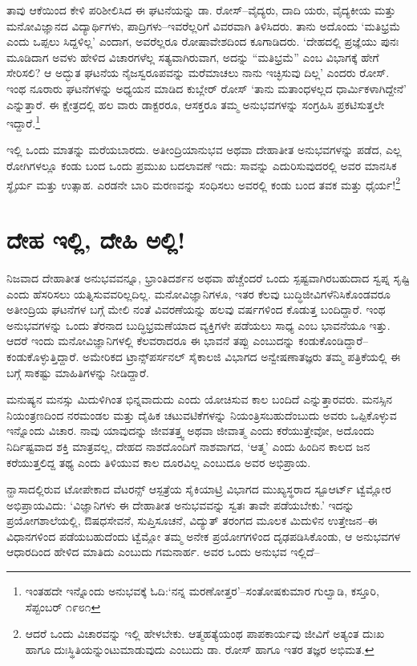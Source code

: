 ತಾವು ಆಕೆಯಿಂದ ಕೇಳಿ ಪರಿಶೀಲಿಸಿದ ಈ ಘಟನೆಯನ್ನು ಡಾ. ರೋಸ್​–ವೈದ್ಯರು, ದಾದಿ ಯರು, ವೈದ್ಯಕೀಯ ಮತ್ತು ಮನೋವಿಜ್ಞಾನದ ವಿದ್ಯಾರ್ಥಿಗಳು, ಪಾದ್ರಿಗಳು–ಇವರೆಲ್ಲರಿಗೆ ವಿವರವಾಗಿ ತಿಳಿಸಿದರು. ತಾನು ಅದೊಂದು ‘ಮತಿಭ್ರಮೆ ಎಂದು ಒಪ್ಪಲು ಸಿದ್ದಳಿಲ್ಲ’ ಎಂದಾಗ, ಅವರೆಲ್ಲರೂ ರೋಷಾವೇಶದಿಂದ ಕೂಗಾಡಿದರು. ‘ದೇಹದಲ್ಲಿ ಪ್ರಜ್ಞೆಯು ಪುನಃ ಮೂಡಿದಾಗ ಅವಳು ಹೇಳಿದ ವಿಚಾರಗಳೆಲ್ಲ ಸತ್ಯವಾಗಿರುವಾಗ, ಅದನ್ನು “ಮತಿಭ್ರಮೆ” ಎಂಬ ವಿಭಾಗಕ್ಕೆ ಹೇಗೆ ಸೇರಿಸಲಿ? ಆ ಅದ್ಭುತ ಘಟನೆಯ ನೈಜಸ್ವರೂಪವನ್ನು ಮರೆಮಾಚಲು ನಾನು ಇಚ್ಛಿಸುವು ದಿಲ್ಲ’ ಎಂದರು ರೋಸ್. ಇಂಥ ನೂರಾರು ಘಟನೆಗಳನ್ನು ಅಧ್ಯಯನ ಮಾಡಿದ ಕುಬ್ಲೇರ್ ರೋಸ್ ‘ತಾನು ಮತಾಂಧಳಲ್ಲದ ಧಾರ್ಮಿಕಳಾಗಿದ್ದೇನೆ’ ಎನ್ನುತ್ತಾರೆ. ಈ ಕ್ಷೇತ್ರದಲ್ಲಿ ಹಲ ವಾರು ಡಾಕ್ಟರರೂ, ಆಸಕ್ತರೂ ತಮ್ಮ ಅನುಭವಗಳನ್ನು ಸಂಗ್ರಹಿಸಿ ಪ್ರಕಟಿಸುತ್ತಲೇ ಇದ್ದಾರೆ.\footnote{ ಇಂತಹದೇ ಇನ್ನೊಂದು ಅನುಭವಕ್ಕೆ ಓದಿ:‘ನನ್ನ ಮರಣೋತ್ತರ’–ಸಂತೋಷಕುಮಾರ ಗುಲ್ವಾಡಿ, ಕಸ್ತೂರಿ, ಸೆಪ್ಟಂಬರ್ ೧೯೮೧}

ಇಲ್ಲಿ ಒಂದು ಮಾತನ್ನು ಮರೆಯಬಾರದು. ಅತೀಂದ್ರಿಯಾನುಭವ ಅಥವಾ ದೇಹಾತೀತ ಅನುಭವಗಳನ್ನು ಪಡೆದ, ಎಲ್ಲ ರೋಗಿಗಳಲ್ಲೂ ಕಂಡು ಬಂದ ಒಂದು ಪ್ರಮುಖ ಬದಲಾವಣೆ ಇದು: ಸಾವನ್ನು ಎದುರಿಸುವುದರಲ್ಲಿ ಅವರ ಮಾನಸಿಕ ಸ್ಥೈರ್ಯ ಮತ್ತು ಉತ್ಸಾಹ. ಎರಡನೇ ಬಾರಿ ಮರಣವನ್ನು ಸಂಧಿಸಲು ಅವರಲ್ಲಿ ಕಂಡು ಬಂದ ತವಕ ಮತ್ತು ಧೈರ್ಯ!\footnote{ ಆದರೆ ಒಂದು ವಿಚಾರವನ್ನು ಇಲ್ಲಿ ಹೇಳಬೇಕು. ಆತ್ಮಹತ್ಯೆಯಂಥ ಪಾಪಕಾರ್ಯವು ಜೀವಿಗೆ ಅತ್ಯಂತ ದುಃಖ ಹಾಗೂ ದುಃಸ್ಥಿತಿಯನ್ನುಂಟುಮಾಡುವುದು ಎಂಬುದು ಡಾ. ರೋಸ್ ಹಾಗೂ ಇತರ ತಜ್ಞರ ಅಭಿಮತ.}


\section{ದೇಹ ಇಲ್ಲಿ, ದೇಹಿ ಅಲ್ಲಿ!}

ನಿಜವಾದ ದೇಹಾತೀತ ಅನುಭವವನ್ನೂ, ಭ್ರಾಂತಿದರ್ಶನ ಅಥವಾ ಹೆಚ್ಚೆಂದರೆ ಒಂದು ಸ್ಪಷ್ಟವಾಗಿರಬಹುದಾದ ಸ್ವಪ್ನ ಸೃಷ್ಟಿ ಎಂದು ಹೆಸರಿಸಲು ಯತ್ನಿಸುವವರಿಲ್ಲದಿಲ್ಲ. ಮನೋವಿಜ್ಞಾನಿಗಳೂ, ಇತರ ಕೆಲವು ಬುದ್ಧಿಜೀವಿಗಳೆನಿಸಿಕೊಂಡವರೂ ಅತೀಂದ್ರಿಯ ಘಟನೆಗಳ ಬಗ್ಗೆ ಮೇಲಿ ನಂತೆ ವಿವರಣೆಯನ್ನು ಹಲವು ವರ್ಷಗಳಿಂದ ಕೊಡುತ್ತ ಬಂದಿದ್ದಾರೆ. ಇಂಥ ಅನುಭವಗಳನ್ನು ಒಂದು ತೆರನಾದ ಬುದ್ಧಿಭ್ರಮಣೆಯಾದ ವ್ಯಕ್ತಿಗಳೇ ಪಡೆಯಲು ಸಾಧ್ಯ ಎಂಬ ಭಾವನೆಯೂ ಇತ್ತು. ಆದರೆ ಇಂದು ಮನೋವಿಜ್ಞಾನಿಗಳಲ್ಲಿ ಕೆಲವರಾದರೂ ಈ ಭಾವನೆ ತಪ್ಪು ಎಂಬುದನ್ನು ಕಂಡುಕೊಂಡಿದ್ದಾರೆ–ಕಂಡುಕೊಳ್ಳುತ್ತಿದ್ದಾರೆ. ಅಮೇರಿಕದ ಟ್ರಾನ್ಸ್​ಪರ್ಸನಲ್ ಸೈಕಾಲಜಿ ವಿಭಾಗದ ಅನ್ವೇಷಣಾತಜ್ಞರು ತಮ್ಮ ಪತ್ರಿಕೆಯಲ್ಲಿ ಈ ಬಗ್ಗೆ ಸಾಕಷ್ಟು ಮಾಹಿತಿಗಳನ್ನು ನೀಡಿದ್ದಾರೆ.

ಮನುಷ್ಯನ ಮನಸ್ಸು ಮಿದುಳಿಗಿಂತ ಭಿನ್ನವಾದುದು ಎಂದು ಯೋಚಿಸುವ ಕಾಲ ಬಂದಿದೆ ಎನ್ನುತ್ತಾರವರು. ಮನಸ್ಸಿನ ನಿಯಂತ್ರಣದಿಂದ ನರಮಂಡಲ ಮತ್ತು ದೈಹಿಕ ಚಟುವಟಿಕೆಗಳನ್ನು ನಿಯಂತ್ರಿಸಬಹುದೆಂಬುದು ಅವರು ಒಪ್ಪಿಕೊಳ್ಳುವ ಇನ್ನೊಂದು ವಿಚಾರ. ನಾವು ಯಾವುದನ್ನು ಜೀವತತ್ತ್ವ ಅಥವಾ ಜೀವಾತ್ಮ ಎಂದು ಕರೆಯುತ್ತೇವೋ, ಅದೊಂದು ನಿರ್ದಿಷ್ಟವಾದ ಶಕ್ತಿ ಮಾತ್ರವಲ್ಲ, ದೇಹದ ನಾಶದೊಂದಿಗೆ ನಾಶವಾಗದ, ‘ಆತ್ಮ’ ಎಂದು ಹಿಂದಿನ ಕಾಲದ ಜನ ಕರೆಯುತ್ತಲಿದ್ದ ತಥ್ಯ ಎಂದು ತಿಳಿಯುವ ಕಾಲ ದೂರವಿಲ್ಲ ಎಂಬುದೂ ಅವರ ಅಭಿಪ್ರಾಯ.

ನ್ಹಾಸಾದಲ್ಲಿರುವ ಟೋಪೇಕಾದ ವೆಟರನ್ಸ್ ಆಸ್ಪತ್ರೆಯ ಸೈಕಿಯಾಟ್ರಿ ವಿಭಾಗದ ಮುಖ್ಯಸ್ಥರಾದ ಸ್ಟೂಆರ್ಟ್ ಟ್ವೆಮ್ಲೋರ ಅಭಿಪ್ರಾಯವಿದು: ‘ವಿಜ್ಞಾನಿಗಳು ಈ ದೇಹಾತೀತ ಅನುಭವವನ್ನು ಸ್ವತಃ ತಾವೇ ಪಡೆಯಬೇಕು.’ ಇದನ್ನು ಪ್ರಯೋಗಶಾಲೆಯಲ್ಲಿ, ಔಷಧಸೇವನೆ, ಸುಪ್ತಿಸೂಚನೆ, ವಿದ್ಯುತ್ ತರಂಗದ ಮೂಲಕ ಮಿದುಳಿನ ಉತ್ತೇಜನ–ಈ ವಿಧಾನಗಳಿಂದ ಪಡೆಯಬಹುದೆಂದು ಟ್ವೆಮ್ಲೋ ತಮ್ಮ ಅನೇಕ ಪ್ರಯೋಗಗಳಿಂದ ದೃಢಪಡಿಸಿಕೊಂಡು, ಆ ಅನುಭವಗಳ ಆಧಾರದಿಂದ ಹೇಳಿದ ಮಾತಿದು ಎಂಬುದು ಗಮನಾರ್ಹ. ಅವರ ಒಂದು ಅನುಭವ ಇಲ್ಲಿದೆ–

